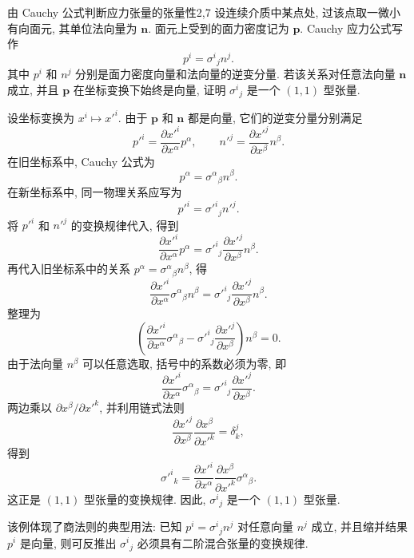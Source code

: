 \begin{example}{由 Cauchy 公式判断应力张量的张量性}{2,7}
	设连续介质中某点处, 过该点取一微小有向面元, 其单位法向量为 $\bm{n}$. 面元上受到的面力密度记为 $\bm{p}$. Cauchy 应力公式写作
	\[
	p^{i}
	=
	\sigma^{i}{}_{j}n^{j}.
	\]
	其中 $p^{i}$ 和 $n^{j}$ 分别是面力密度向量和法向量的逆变分量. 若该关系对任意法向量 $\bm{n}$ 成立, 并且 $\bm{p}$ 在坐标变换下始终是向量, 证明 $\sigma^{i}{}_{j}$ 是一个 $(1,1)$ 型张量. 
	\begin{solution}
		设坐标变换为 $x^{i}\mapsto x'^{i}$. 由于 $\bm{p}$ 和 $\bm{n}$ 都是向量, 它们的逆变分量分别满足
		\[
		p'^{i}
		=
		\frac{\partial x'^{i}}{\partial x^{\alpha}}p^{\alpha},
		\qquad
		n'^{j}
		=
		\frac{\partial x'^{j}}{\partial x^{\beta}}n^{\beta}.
		\]
		在旧坐标系中, Cauchy 公式为
		\[
		p^{\alpha}
		=
		\sigma^{\alpha}{}_{\beta}n^{\beta}.
		\]
		在新坐标系中, 同一物理关系应写为
		\[
		p'^{i}
		=
		\sigma'^{i}{}_{j}n'^{j}.
		\]
		将 $p'^{i}$ 和 $n'^{j}$ 的变换规律代入, 得到
		\[
		\frac{\partial x'^{i}}{\partial x^{\alpha}}p^{\alpha}
		=
		\sigma'^{i}{}_{j}
		\frac{\partial x'^{j}}{\partial x^{\beta}}n^{\beta}.
		\]
		再代入旧坐标系中的关系 $p^{\alpha}=\sigma^{\alpha}{}_{\beta}n^{\beta}$, 得
		\[
		\frac{\partial x'^{i}}{\partial x^{\alpha}}
		\sigma^{\alpha}{}_{\beta}n^{\beta}
		=
		\sigma'^{i}{}_{j}
		\frac{\partial x'^{j}}{\partial x^{\beta}}n^{\beta}.
		\]
		整理为
		\[
		\left(
		\frac{\partial x'^{i}}{\partial x^{\alpha}}
		\sigma^{\alpha}{}_{\beta}
		-
		\sigma'^{i}{}_{j}
		\frac{\partial x'^{j}}{\partial x^{\beta}}
		\right)n^{\beta}
		=
		0.
		\]
		由于法向量 $n^{\beta}$ 可以任意选取, 括号中的系数必须为零, 即
		\[
		\frac{\partial x'^{i}}{\partial x^{\alpha}}
		\sigma^{\alpha}{}_{\beta}
		=
		\sigma'^{i}{}_{j}
		\frac{\partial x'^{j}}{\partial x^{\beta}}.
		\]
		两边乘以 $\partial x^{\beta}/\partial x'^{k}$, 并利用链式法则
		\[
		\frac{\partial x'^{j}}{\partial x^{\beta}}
		\frac{\partial x^{\beta}}{\partial x'^{k}}
		=
		\delta^{j}_{k},
		\]
		得到
		\[
		\sigma'^{i}{}_{k}
		=
		\frac{\partial x'^{i}}{\partial x^{\alpha}}
		\frac{\partial x^{\beta}}{\partial x'^{k}}
		\sigma^{\alpha}{}_{\beta}.
		\]
		这正是 $(1,1)$ 型张量的变换规律. 因此, $\sigma^{i}{}_{j}$ 是一个 $(1,1)$ 型张量. 
		
		该例体现了商法则的典型用法: 已知 $p^{i}=\sigma^{i}{}_{j}n^{j}$ 对任意向量 $n^{j}$ 成立, 并且缩并结果 $p^{i}$ 是向量, 则可反推出 $\sigma^{i}{}_{j}$ 必须具有二阶混合张量的变换规律. 
	\end{solution}
\end{example}


